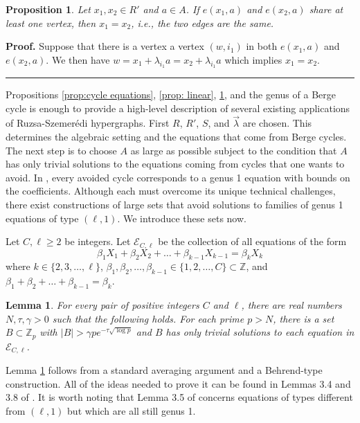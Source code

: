 \documentclass[12pt]{article}%
\newtheorem{lemma}[theorem]{Lemma}
\newtheorem{proposition}[theorem]{Proposition}
\newenvironment{proof}[1][Proof]{\noindent\textbf{#1.} }
{\hfill \ \rule{0.5em}{0.5em}}
\begin{document}
\begin{proposition}\label{prop:consecutive edges}
    Let $x_1,x_2 \in R'$ and $a \in A$.  If $e(x_1 , a)$ and $e(x_2 , a)$ share at least one vertex, then $x_1 = x_2$, i.e., the two edges are the same. 
 \end{proposition}
\begin{proof}
    Suppose that there is a vertex a vertex $( w , i_1)$ in both $e(x_1, a)$ and $e(x_2 , a)$.  We then have $w = x_1 +  \lambda_{i_1} a = x_2 + \lambda_{i_1} a$ which implies $x_1 = x_2$.    
\end{proof}

\medskip
Propositions \ref{prop:cycle equations}, \ref{prop: linear}, \ref{prop:consecutive edges}, and 
the genus of a Berge cycle is enough to provide a high-level description of several existing applications of Ruzsa-Szemer\'{e}di hypergraphs.  First $R$, $R'$, $S$, and $\vec{ \lambda}$ are chosen.  This determines the algebraic setting and the equations that come from Berge cycles.    
The next step is to choose $A$ as large as possible subject to the condition that $A$ has only trivial solutions to the equations coming from cycles that one wants to avoid.  In \cite{alon, alonFischerSzegedy, Ge-Hash, Ge}, every avoided cycle corresponds to a genus 1 equation with bounds on the coefficients.  Although each must overcome its unique technical challenges, there exist constructions of large sets that avoid solutions to families of genus 1 equations of type $(\ell,1)$.  We introduce these sets now.   

Let $C , \ell \geq 2$ be integers.  Let $\mathcal{E}_{C , \ell}$ be the collection of all equations of the form 
\[
\beta_1 X_1 + \beta_2 X_2 + \dots + \beta_{k-1} X_{k-1} 
= \beta_k X_k
\]
where $k \in \{2,3, \dots , \ell \}$, 
$\beta_1, \beta_2 , \dots , \beta_{k-1} \in \{1,2, \dots , C \} \subset \mathbb{Z}$, and $\beta_1 + \beta_2 + \dots + \beta_{k-1} = \beta_k$.  

\begin{lemma}\label{lemma:multiple Behrend}
For every pair of positive integers $C$ and $\ell$, there are real numbers $N, \tau , \gamma >0$ such that the following holds.  For each prime $p > N$, there is a 
set $ B \subset \mathbb{Z}_p$ with $|B| > \gamma p e^{ - \tau \sqrt{ \log p } } $ and $B$ has only trivial solutions to each equation in $\mathcal{E}_{C, \ell}$.   \end{lemma}

Lemma \ref{lemma:multiple Behrend} follows from a standard averaging argument and a Behrend-type construction.  All of the ideas needed to prove it can be found in Lemmas 3.4 and 3.8 of \cite{Ge}.  
It is worth noting that Lemma 3.5 of \cite{Ge} concerns equations of types different from $( \ell , 1)$ but which are all still genus 1.   
\end{document}
